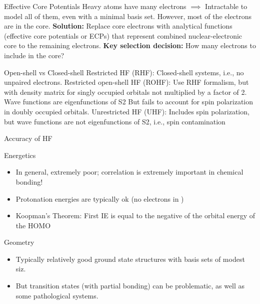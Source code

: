 \documentclass[aspectratio=169]{beamer}
\begin{document}
    \begin{frame}{Effective Core Potentials}
        Heavy atoms have many electrons $\implies$ Intractable to model all of them, even with a minimal basis set.\newline
        \newline
        However, most of the electrons are in the core.\newline
        \newline
        \textbf{Solution:} Replace core electrons with analytical functions (effective core potentials or ECPs) that represent combined nuclear-electronic core to the remaining electrons.\newline
        \newline
        \textbf{Key selection decision:} How many electrons to include in the core?

    \end{frame}


    \begin{frame}{Open-shell vs Closed-shell}
        Restricted HF (RHF): Closed-shell systems, i.e., no unpaired electrons.\newline
        \newline
        Restricted open-shell HF (ROHF): Use RHF formalism, but with density matrix for singly occupied orbitals not multiplied by a factor of 2. Wave functions are eigenfunctions of S2 But fails to account for spin polarization in doubly occupied orbitals.\newline
        \newline
        Unrestricted HF (UHF): Includes spin polarization, but wave functions are not eigenfunctions of S2, i.e., spin contamination

    \end{frame}

    \begin{frame}{Accuracy of HF}

        Energetics
        \begin{itemize}
            \item In general, extremely poor; correlation is extremely important in chemical bonding!
            \item Protonation energies are typically ok (no electrons in )
            \item Koopman's Theorem: First IE is equal to the negative of the orbital energy of the HOMO
        \end{itemize}

        Geometry
        \begin{itemize}
            \item Typically relatively good ground state structures with basis sets of modest siz.
            \item But transition states (with partial bonding) can be problematic, as well as some pathological systems.
        \end{itemize}

    \end{frame}
\end{document}
